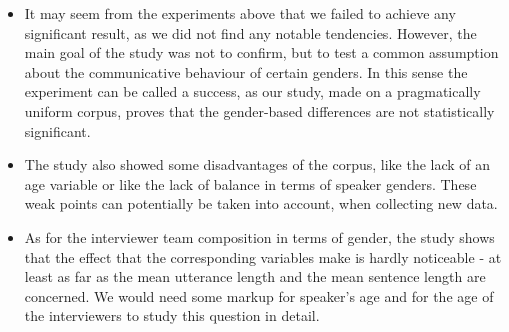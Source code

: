 \documentclass[
]{article}
\providecommand{\tightlist}{%
  \setlength{\itemsep}{0pt}\setlength{\parskip}{0pt}}
\begin{document}
\begin{itemize}
\tightlist
\item
  It may seem from the experiments above that we failed to achieve any
  significant result, as we did not find any notable tendencies.
  However, the main goal of the study was not to confirm, but to test a
  common assumption about the communicative behaviour of certain
  genders. In this sense the experiment can be called a success, as our
  study, made on a pragmatically uniform corpus, proves that the
  gender-based differences are not statistically significant.
\item
  The study also showed some disadvantages of the corpus, like the lack
  of an age variable or like the lack of balance in terms of speaker
  genders. These weak points can potentially be taken into account, when
  collecting new data.
\item
  As for the interviewer team composition in terms of gender, the study
  shows that the effect that the corresponding variables make is hardly
  noticeable - at least as far as the mean utterance length and the mean
  sentence length are concerned. We would need some markup for speaker's
  age and for the age of the interviewers to study this question in
  detail.
\end{itemize}
\end{document}
